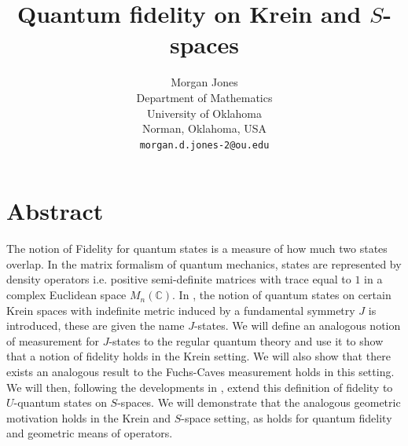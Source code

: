 \documentclass{amsart}
\title{Quantum fidelity on Krein and $S$-spaces}
\author[]{%
Morgan Jones\\
\small Department of Mathematics\\
\small University of Oklahoma\\
\small Norman, Oklahoma, USA\\
\small \texttt{morgan.d.jones-2@ou.edu}
}
\numberwithin{equation}{section}
\theoremstyle{definition}
\theoremstyle{plain}
\theoremstyle{solutionstyle}
\begin{document}
\maketitle

\enlargethispage{3\baselineskip}
\tableofcontents
\section{Abstract}

The notion of Fidelity for quantum states is a measure of how much two states overlap. In the matrix formalism of quantum mechanics, states are represented by density operators i.e. positive semi-definite matrices with trace equal to $1$ in a complex Euclidean space $M_n(\mathbb{C})$. In \cite{FelipeSosa2022}, the notion of quantum states on certain Krein spaces with indefinite metric induced by a fundamental symmetry $J$ is introduced, these are given the name $J$-states. We will define an analogous notion of measurement for $J$-states to the regular quantum theory and use it to show that a notion of fidelity holds in the Krein setting. We will also show that there exists an analogous result to the Fuchs-Caves measurement holds in this setting. We will then, following the developments in \cite{bag2024quantumuchannelssspaces}, extend this definition of fidelity to $U$-quantum states on $S$-spaces. We will demonstrate that the analogous geometric motivation holds in the Krein and $S$-space setting, as holds for quantum fidelity and geometric means of operators.
\end{document}
